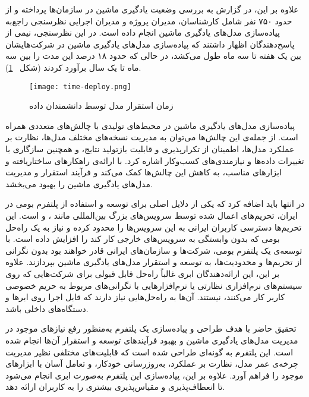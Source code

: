 علاوه بر این، در گزارش \cite{algorithmiaMLState} به بررسی وضعیت یادگیری ماشین در سازمان‌ها پرداخته و از حدود ۷۵۰ نفر شامل کارشناسان، مدیران پروژه و مدیران اجرایی نظرسنجی راجع‌به پیاده‌سازی مدل‌های یادگیری ماشین انجام داده است. در این نظرسنجی، نیمی از پاسخ‌دهندگان اظهار داشتند که پیاده‌سازی مدل‌های یادگیری ماشین در شرکت‌هایشان بین یک هفته تا سه ماه طول می‌کشد، در حالی که حدود ۱۸ درصد این مدت را بین سه ماه تا یک سال برآورد کردند (شکل ~\ref{fig: time deploy}). 

\begin{figure}[!t]
	\centering
	\texttt{[image: time-deploy.png]}
	\caption{زمان استقرار مدل توسط دانشمندان داده}
	\label{fig: time deploy}
\end{figure}

پیاده‌سازی مدل‌های یادگیری ماشین در محیط‌های تولیدی با چالش‌های متعددی همراه است. از جمله‌ی این چالش‌ها می‌توان به مدیریت نسخه‌های مختلف مدل‌ها، نظارت بر عملکرد مدل‌ها، اطمینان از تکرارپذیری و قابلیت بازتولید نتایج، و همچنین سازگاری با تغییرات داده‌ها و نیازمندی‌های کسب‌وکار اشاره کرد.  با ارائه‌ی راهکارهای ساختاریافته و ابزارهای مناسب، به کاهش این چالش‌ها کمک می‌کند و فرآیند استقرار و مدیریت مدل‌های یادگیری ماشین را بهبود می‌بخشد.

در انتها باید اضافه کرد که یکی از دلایل اصلی برای توسعه و استفاده از پلتفرم بومی  در ایران، تحریم‌های اعمال شده توسط سرویس‌های بزرگ بین‌المللی مانند
،
 و  است. این تحریم‌ها دسترسی کاربران ایرانی به این سرویس‌ها را محدود کرده و نیاز به یک راه‌حل بومی که بدون وابستگی به سرویس‌های خارجی کار کند را افزایش داده است. با توسعه‌ی یک پلتفرم بومی، شرکت‌ها و سازمان‌های ایرانی قادر خواهند بود بدون نگرانی از تحریم‌ها و محدودیت‌ها، به توسعه و استقرار مدل‌های یادگیری ماشین بپردازند. علاوه بر این، 
این ارائه‌دهندگان ابری غالباً راه‌حل قابل قبولی برای شرکت‌هایی که روی سیستم‌های نرم‌افزاری نظارتی یا نرم‌افزارهایی با نگرانی‌های مربوط به حریم خصوصی کاربر کار می‌کنند، نیستند. آن‌ها به راه‌حل‌هایی نیاز دارند که قابل اجرا روی ابرها و دستگاه‌های داخلی باشد.

تحقیق حاضر با هدف طراحی و پیاده‌سازی یک پلتفرم  به‌منظور رفع نیازهای موجود در مدیریت مدل‌های یادگیری ماشین و بهبود فرآیندهای توسعه و استقرار آن‌ها انجام شده است. این پلتفرم به گونه‌ای طراحی شده است که قابلیت‌های مختلفی نظیر مدیریت چرخه‌ی عمر مدل، نظارت بر عملکرد، به‌روزرسانی خودکار، و تعامل آسان با ابزارهای موجود را فراهم آورد. علاوه بر این، پیاده‌سازی این پلتفرم به‌صورت ابری انجام می‌شود تا انعطاف‌پذیری و مقیاس‌پذیری بیشتری را به کاربران ارائه دهد.


